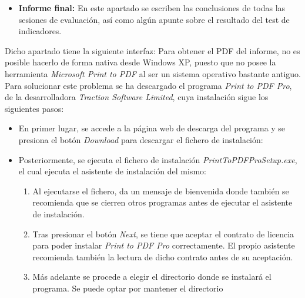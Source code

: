 \begin{itemize}
\begin{itemize}
            \item \textbf{Informe final:} En este apartado se escriben las conclusiones de todas las sesiones de evaluación, así como algún apunte sobre el resultado del test de indicadores.
        \end{itemize}
        Dicho apartado tiene la siguiente interfaz:
        Para obtener el PDF del informe, no es posible hacerlo de forma nativa
        desde Windows XP, puesto que no posee la herramienta \textit{Microsoft
        Print to PDF} al ser un sistema operativo bastante antiguo. Para
        solucionar este problema se ha descargado el programa \textit{Print to
        PDF Pro}, de la desarrolladora \textit{Traction Software Limited}, cuya instalación sigue los siguientes pasos:
        \begin{itemize}
            \item En primer lugar, se accede a la página web de descarga del
            programa y se presiona el botón \textit{Download} para descargar el
            fichero de instalación:
            \item Posteriormente, se ejecuta el fichero de instalación \textit{PrintToPDFProSetup.exe}, el cual ejecuta el asistente de instalación del mismo:
            \begin{enumerate}
                \item Al ejecutarse el fichero, da un mensaje de bienvenida
                donde también se recomienda que se cierren otros programas antes
                de ejecutar el asistente de
                instalación. 
                \item Tras presionar el botón \textit{Next}, se tiene que aceptar
                el contrato de licencia para poder instalar \textit{Print to PDF
                Pro} correctamente. El propio asistente recomienda también la
                lectura de dicho contrato antes de su
                aceptación. 
                \item Más adelante se procede a elegir el directorio donde se
                instalará el programa. Se puede optar por mantener el directorio

\end{enumerate}
\end{itemize}
\end{itemize}
